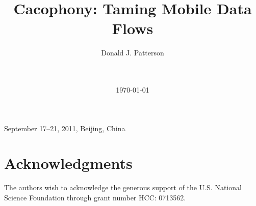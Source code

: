 \documentclass{chi2008}
\title{Cacophony: Taming Mobile Data Flows}
\author{
\alignauthor
Donald J. Patterson\\
       \affaddr{Department of Informatics}\\
       \affaddr{University of California, Irvine, USA}\\
       \email{ \{djp3\}@uci.edu}
}
\begin{document}
 {September 17--21, 2011, Beijing, China} 





\date{\today}

\maketitle






\section{Acknowledgments}
The authors wish to acknowledge the generous support of the U.S. National
Science Foundation through grant number HCC: 0713562.



\balancecolumns
\end{document}
